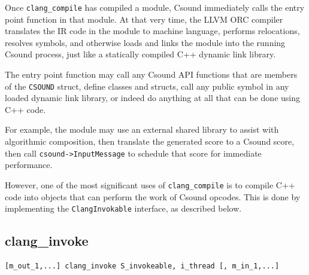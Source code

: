 \documentclass[letterpaper, 12pt]{article}
\begin{document}
Once \verb|clang_compile| has compiled a module, Csound immediately 
calls the entry point function in that module. At that very time, the LLVM ORC 
compiler translates the IR code in the module to machine language, performs 
relocations, resolves symbols, and otherwise loads and links the module into the 
running Csound process, just like a statically compiled C++ dynamic link library.

The entry point function may call any Csound API functions that are members of 
the \verb|CSOUND| struct, define classes and structs, call any public symbol in any 
loaded dynamic link library, or indeed do anything at all that can be done 
using C++ code.

For example, the module may use an external shared library to assist with 
algorithmic composition, then translate the generated score to a Csound score, 
then call \verb|csound->InputMessage| to schedule that score for immediate 
performance.

However, one of the most significant uses of \verb|clang_compile| is to compile C++
code into objects that can perform the work of Csound opcodes. This is 
done by implementing the \verb|ClangInvokable| interface, as described below.

\subsection{clang\_invoke}

\begin{Verbatim}[fontfamily=courier, xleftmargin=\parindent]
[m_out_1,...] clang_invoke S_invokeable, i_thread [, m_in_1,...]
\end{Verbatim}
\end{document}
